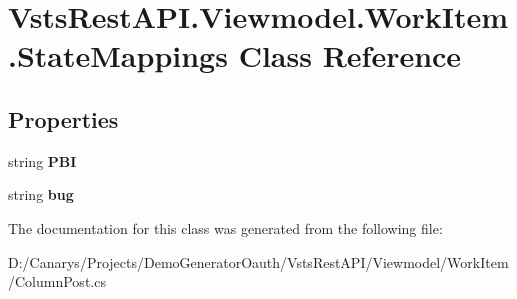 \hypertarget{class_vsts_rest_a_p_i_1_1_viewmodel_1_1_work_item_1_1_state_mappings}{}\section{Vsts\+Rest\+A\+P\+I.\+Viewmodel.\+Work\+Item.\+State\+Mappings Class Reference}
\label{class_vsts_rest_a_p_i_1_1_viewmodel_1_1_work_item_1_1_state_mappings}
\subsection*{Properties}
\begin{DoxyCompactItemize}
\item 
\mbox{\label{class_vsts_rest_a_p_i_1_1_viewmodel_1_1_work_item_1_1_state_mappings_aabcbcf068fd0dda0fc7fc920d64d3a0c}} 
string {\bfseries P\+BI}
\item 
\mbox{\label{class_vsts_rest_a_p_i_1_1_viewmodel_1_1_work_item_1_1_state_mappings_ac5ec66dbf9bd4ed8c50d638ae8930ffb}} 
string {\bfseries bug}
\end{DoxyCompactItemize}


The documentation for this class was generated from the following file\+:\begin{DoxyCompactItemize}
\item 
D\+:/\+Canarys/\+Projects/\+Demo\+Generator\+Oauth/\+Vsts\+Rest\+A\+P\+I/\+Viewmodel/\+Work\+Item/Column\+Post.\+cs\end{DoxyCompactItemize}
